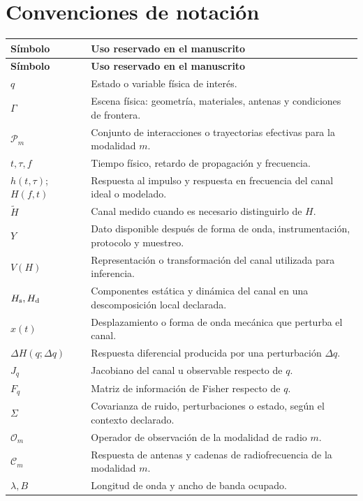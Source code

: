 \chapter*{Convenciones de notación}
\begingroup
\small
{}
\begin{longtable}{P{3.6cm}P{10.0cm}}
\toprule
\textbf{Símbolo} & \textbf{Uso reservado en el manuscrito}\\
\midrule
\endfirsthead
\toprule
\textbf{Símbolo} & \textbf{Uso reservado en el manuscrito}\\
\midrule
\endhead
$q$ & Estado o variable física de interés.\\
$\Gamma$ & Escena física: geometría, materiales, antenas y condiciones de frontera.\\
$\mathcal P_m$ & Conjunto de interacciones o trayectorias efectivas para la modalidad $m$.\\
$t,\tau,f$ & Tiempo físico, retardo de propagación y frecuencia.\\
$h(t,\tau)$; $H(f,t)$ & Respuesta al impulso y respuesta en frecuencia del canal ideal o modelado.\\
$\widetilde H$ & Canal medido cuando es necesario distinguirlo de $H$.\\
$Y$ & Dato disponible después de forma de onda, instrumentación, protocolo y muestreo.\\
$V(H)$ & Representación o transformación del canal utilizada para inferencia.\\
$H_{\rm s},H_{\rm d}$ & Componentes estática y dinámica del canal en una descomposición local declarada.\\
$x(t)$ & Desplazamiento o forma de onda mecánica que perturba el canal.\\
$\Delta H(q;\Delta q)$ & Respuesta diferencial producida por una perturbación $\Delta q$.\\
$J_q$ & Jacobiano del canal u observable respecto de $q$.\\
$F_q$ & Matriz de información de Fisher respecto de $q$.\\
$\Sigma$ & Covarianza de ruido, perturbaciones o estado, según el contexto declarado.\\
$\mathcal O_m$ & Operador de observación de la modalidad de radio $m$.\\
$\mathcal C_m$ & Respuesta de antenas y cadenas de radiofrecuencia de la modalidad $m$.\\
$\lambda,B$ & Longitud de onda y ancho de banda ocupado.\\

\end{longtable}
